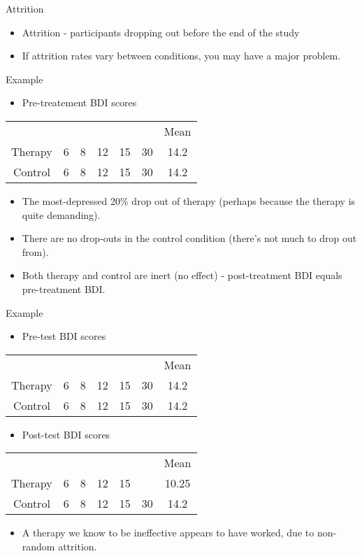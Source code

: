 \documentclass{beamer}
\begin{document}
\begin{frame}{Attrition}
\begin{itemize}
\item Attrition - participants dropping out before the end of the study
\item If attrition rates vary between conditions, you may have a major problem.
\end{itemize}
\end{frame}

\begin{frame}{Example}
\begin{itemize}
\item Pre-treatement BDI scores
\end{itemize}
\begin{tabular} {c c c c c c c}
 &  &  &  &  &  & Mean \\
Therapy	& 6 & 8	& 12 & 15 & 30 & 14.2 \\
Control	& 6 & 8	& 12 & 15 & 30 & 14.2 \\
\end{tabular} 
\vspace{12 pt}
\begin{itemize}
\item The most-depressed 20\% drop out of therapy (perhaps because the therapy is quite demanding).
\item There are no drop-outs in the control condition (there's not much to drop out from).
\item Both therapy and control are inert (no effect) - post-treatment BDI equals pre-treatment BDI.
\end{itemize}
\end{frame}

\begin{frame}{Example}
\begin{itemize}
\item Pre-test BDI scores
\end{itemize}
\begin{tabular} {c c c c c c c}
 &  &  &  &  &  & Mean \\
Therapy	& 6 & 8	& 12 & 15 & 30 & 14.2 \\
Control	& 6 & 8	& 12 & 15 & 30 & 14.2 \\
\end{tabular} 
\begin{itemize}
\item Post-test BDI scores
\end{itemize}
\begin{tabular} {c c c c c c c}
 &  &  &  &  &  & Mean \\
Therapy	& 6 & 8	& 12 & 15 &  & 10.25 \\
Control	& 6 & 8	& 12 & 15 & 30 & 14.2 \\
\end{tabular} 

\vspace{12 pt}
\begin{itemize}
\item A therapy we know to be ineffective appears to have worked, due to non-random attrition.
\end{itemize}
\end{frame}
\end{document}
